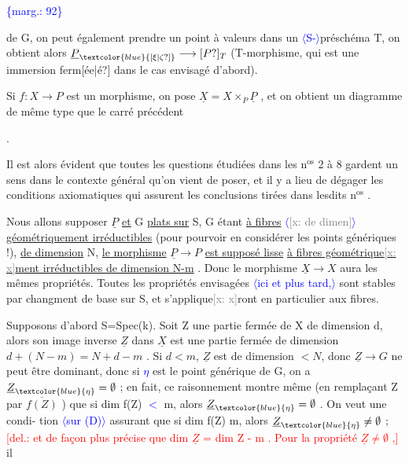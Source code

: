 \documentclass[11pt]{article}
\newcommand{\scanpage}[1]{\par\bigskip\noindent{\small\sffamily[scan #1]}\par}
\newcommand{\mspage}[1]{{\small\sffamily[p.\,#1]}}
\newcommand{\hand}[1]{\textcolor{blue}{#1}}
\let\over\relax
\newcommand{\over}[2]{\textcolor{gray}{#1}\textcolor{blue}{\ensuremath{^{\!\nearrow}}#2}}
\newcommand{\inserted}[2][]{\textcolor{blue}{$\langle$#2$\rangle$}}
\newcommand{\margin}[1]{\textcolor{blue}{\{\textsf{marg.:} #1\}}}
\newcommand{\deleted}[1]{\textcolor{red}{[\textsf{del.:} #1]}}
\newcommand{\xout}[1]{\textcolor{gray}{[\textsf{x:} #1]}}
\newcommand{\uline}[1]{\underline{#1}}
\newcommand{\unsure}[1]{[#1?]}
\newenvironment{diagramblock}{\par\begin{center}}{\end{center}\par}
\begin{document}
\margin{92}

\clearpage
\scanpage{25/93}
\mspage{87}
de G, on peut également prendre un point à valeurs dans un \inserted[typed]{S-}préschéma T,
on obtient alors $\underline{P}_{\hand{\unsure{\xi|\zeta}}} \longrightarrow \unsure{P}_T$ (T-morphisme, qui est une immersion ferm\unsure{ée|é}
dans le cas envisagé d'abord).

Si $f:X \longrightarrow P$ est un morphisme, on pose $\underline{X} = X\times_P\underline{P}$ , et on obtient
un diagramme de même type que le carré précédent
\begin{diagramblock}\end{diagramblock}
.

Il est alors évident que toutes les questions étudiées dans les n$^{\text{os}}$ 2 à 8
gardent un sens dans le contexte général qu'on vient de poser, et il y a
lieu de dégager les conditions axiomatiques qui assurent les conclusions
tirées dans lesdits n$^{\text{os}}$ .

Nous allons supposer $\underline{P}$ \uline{et} G \uline{plats sur} S, G étant \uline{à fibres}
\inserted[typed]{\xout{de dimen}}
\uline{géométriquement irréductibles} (pour pourvoir en considérer les points
génériques !), \uline{de dimension} N, \uline{le morphisme} $\underline{P} \longrightarrow P$ \uline{est supposé lisse}
\uline{à fibres géométrique\xout{x}ment irréductibles de dimension N-m} . Donc le
morphisme $\underline{X} \longrightarrow X$ aura les mêmes propriétés. Toutes les propriétés
envisagées \inserted{ici et plus tard,} sont stables par changment de base sur S, et s'applique\xout{x}ront
en particulier aux fibres.

Supposons d'abord S=Spec(k). Soit Z une partie fermée de X de
dimension d, alors son image inverse $\underline{Z}$ dans $\underline{X}$ est une partie fermée de
dimension $d + (N-m) = N + d-m$ . Si $d < m$, $\underline{Z}$ est de dimension $< N$,
donc $\underline{Z} \longrightarrow G$ ne peut être dominant, donc si \hand{$\eta$} est le point générique de
G, on a $\underline{Z}_{\hand{\eta}} = \emptyset$ ; en fait, ce raisonnement montre même (en remplaçant
Z par $\overline{f(Z)}$ ) que si dim f(Z) \hand{$<$} m, alors $\underline{Z}_{\hand{\eta}} = \emptyset$ . On veut une condi-%
tion \inserted{sur (D)} assurant que si dim f(Z) \over{\unsure{$<$}}{$\geq$} m, alors $\underline{Z}_{\hand{\eta}} \neq \emptyset$ ; \deleted{et de façon plus
précise que dim $\underline{Z}$ = dim Z - m . Pour la propriété $\underline{Z} \neq \emptyset$ ,} il
\end{document}
